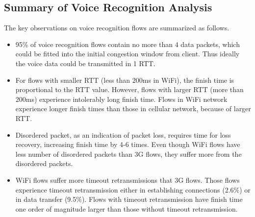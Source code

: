 \subsection{Summary of Voice Recognition Analysis}

The key observations on voice recognition flows are summarized as follows.
\begin{itemize}
	\item 95\% of voice recognition flows contain no more than 4 data packets, which could be fitted into the initial congestion window from client. Thus ideally the voice data could be transmitted in 1 RTT.
	\item For flows with smaller RTT (less than 200ms in WiFi), the finish time is proportional to the RTT value. However, flows with larger RTT (more than 200ms) experience intolerably long finish time. Flows in WiFi network experience longer finish times than those in cellular network, because of larger RTT.
	\item Disordered packet, as an indication of packet loss, requires time for loss recovery, increasing finish time by 4-6 times. Even though WiFi flows have less number of disordered packets than 3G flows, they suffer more from the disordered packets.
	\item WiFi flows suffer more timeout retransmissions that 3G flows. Those flows experience timeout retransmission either in establishing connections (2.6\%) or in data transfer (9.5\%). Flows with timeout retransmission have finish time one order of magnitude larger than those without timeout retransmission.
\end{itemize}
